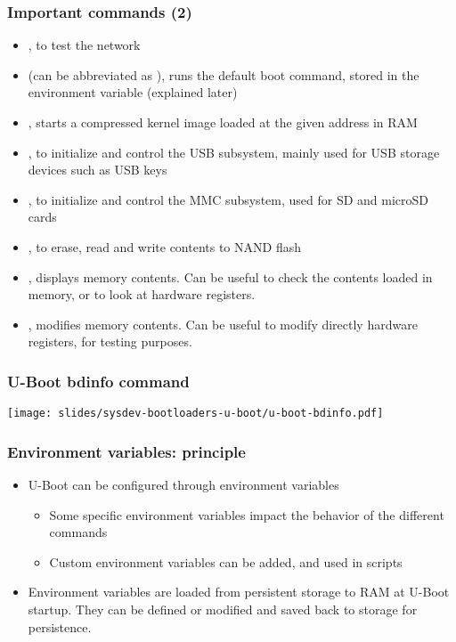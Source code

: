 \begin{frame}
  \frametitle{Important commands (2)}
  \begin{itemize}
  \item {}, to test the network
  \item {} (can be abbreviated as ), runs the default
    boot command, stored in the  environment variable (explained later)
  \item {}, starts a compressed kernel image loaded at the
    given address in RAM
  \item {}, to initialize and control the USB subsystem,
    mainly used for USB storage devices such as USB keys
  \item {}, to initialize and control the MMC subsystem, used
    for SD and microSD cards
  \item {}, to erase, read and write contents to NAND flash
  \item {}, displays memory contents. Can be useful to check the
    contents loaded in memory, or to look at hardware registers.
  \item {}, modifies memory contents. Can be useful to modify
    directly hardware registers, for testing purposes.
\end{itemize}
\end{frame}

\begin{frame}
  \frametitle{U-Boot bdinfo command}
  \texttt{[image: slides/sysdev-bootloaders-u-boot/u-boot-bdinfo.pdf]}
\end{frame}

\begin{frame}
  \frametitle{Environment variables: principle}
  \begin{itemize}
  \item U-Boot can be configured through environment variables
    \begin{itemize}
    \item Some specific environment variables impact the behavior of
      the different commands
    \item Custom environment variables can be added, and used in
      scripts
    \end{itemize}
  \item Environment variables are loaded from persistent storage to RAM at U-Boot
    startup. They can be defined or modified and saved back to storage
    for persistence.
  \end{itemize}
\end{frame}

